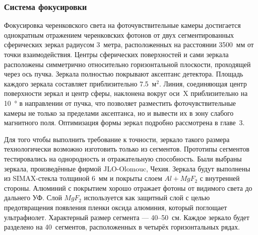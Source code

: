 \subsubsection{Система фокусировки}\label{sec:CbmRichMirrors}

Фокусировка черенковского света на фоточувствительные камеры достигается однократным отражением черенковских фотонов от двух сегментированных сферических зеркал радиусом 3~метра, расположенных на расстоянии 3500~мм от точки взаимодействия.
Центры сферических поверхностей и сами зеркала расположены симметрично относительно горизонтальной плоскости, проходящей через ось пучка.
Зеркала полностью покрывают аксептанс детектора. Площадь каждого зеркала составляет приблизительно 7.5~м$^2$.
Линия, соединяющая центр поверхности зеркал и центр сферы, наклонена вокруг оси~X приблизительно на \SI{10}{\degree} в направлении от пучка,
что позволяет разместить фоточувствительные камеры не только за пределами аксептанса, но и вывести их в зону слабого магнитного поля.
Оптимизация формы зеркал подробно рассмотрена в главе~3. %

Для того чтобы выполнить требование к точности, зеркало такого размера технологически возможно изготовить только из сегментов. Прототипы сегментов тестировались на однородность и отражательную способность. Были выбраны зеркала, произведённые фирмой \mbox{JLO-Olomouc}, Чехия. Зеркала будут выполнены из SIMAX-стекла толщиной 6~мм и покрыты слоем $Al+MgF_{2}$ с внутренней стороны. Алюминий с покрытием хорошо отражает фотоны от видимого света до дальнего УФ. Слой $MgF_{2}$ используется как защитный слой с целью предотвращения появления пленки оксида алюминия, который поглощает ультрафиолет. Характерный размер сегмента --- 40--50~см. Каждое зеркало будет разделено на 40~сегментов, расположенных в четырёх горизонтальных рядах.


